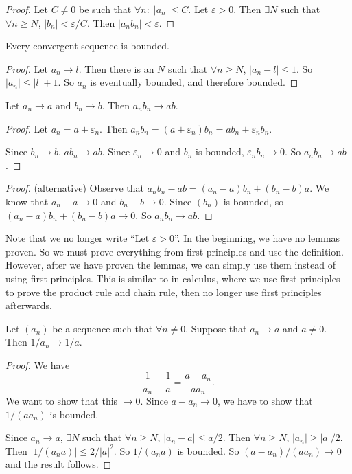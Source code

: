 \documentclass[a4paper]{article}
\begin{document}
\begin{proof}
  Let $C\not=0$ be such that $\forall n:\; |a_n|\leq C$. Let $\varepsilon > 0$. Then $\exists N$ such that $\forall n\geq N$, $|b_n| < \varepsilon/C$. Then $|a_nb_n| < \varepsilon$.
\end{proof}

\begin{lemma}
  Every convergent sequence is bounded.
\end{lemma}

\begin{proof}
  Let $a_n \to l$. Then there is an $N$ such that $\forall n \geq N$, $|a_n - l| \leq 1$. So $|a_n| \leq |l| + 1$. So $a_n$ is eventually bounded, and therefore bounded.
\end{proof}

\begin{lemma}
  Let $a_n\to a$ and $b_n\to b$. Then $a_nb_n\to ab$.
\end{lemma}

\begin{proof}
  Let $a_n = a + \varepsilon_n$. Then $a_nb_n = (a + \varepsilon_n)b_n = ab_n + \varepsilon_n b_n$.

  Since $b_n \to b$, $ab_n \to ab$. Since $\varepsilon_n \to 0$ and $b_n$ is bounded, $\varepsilon_nb_n \to 0$. So $a_nb_n \to ab$.
\end{proof}

\begin{proof}
  (alternative) Observe that $a_nb_n - ab = (a_n - a) b_n + (b_n - b)a$. We know that $a_n - a \to 0$ and $b_n - b\to 0$. Since $(b_n)$ is bounded, so $(a_n - a)b_n + (b_n - b)a \to 0$. So $a_nb_n \to ab$.
\end{proof}

Note that we no longer write ``Let $\varepsilon > 0$''. In the beginning, we have no lemmas proven. So we must prove everything from first principles and use the definition. However, after we have proven the lemmas, we can simply use them instead of using first principles. This is similar to in calculus, where we use first principles to prove the product rule and chain rule, then no longer use first principles afterwards.

\begin{lemma}
  Let $(a_n)$ be a sequence such that $\forall n \not= 0$. Suppose that $a_n \to a$ and $a\not = 0$. Then $1/a_n \to 1/a$.
\end{lemma}

\begin{proof}
  We have
  \[
    \frac{1}{a_n} - \frac{1}{a} = \frac{a - a_n}{aa_n}.
  \]
  We want to show that this $\to 0$. Since $a - a_n \to 0$, we have to show that $1/(aa_n)$ is bounded.

  Since $a_n \to a$, $\exists N$ such that $\forall n\geq N$, $|a_n - a| \leq a/2$. Then $\forall n\geq N$, $|a_n| \geq |a|/2$. Then $|1/(a_na)| \leq 2/|a|^2$. So $1/(a_na)$ is bounded. So $(a - a_n)/(aa_n)\to 0$ and the result follows.
\end{proof}
\end{document}
